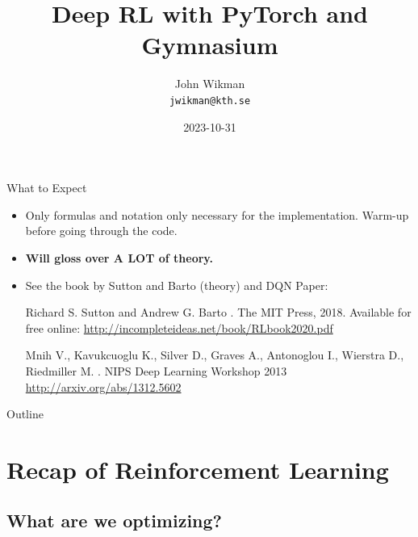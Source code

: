 \documentclass[aspectratio=1609,ADDITIONAL_DOCCLASS_ARGS]{beamer}
\title{Deep RL with PyTorch and Gymnasium}
\author{\parbox[t][5mm][c]{5cm}{\centering John Wikman\\\small{\texttt{jwikman@kth.se}}\vspace{5mm}}}
\institute{KTH Royal Institute of Technology}
\date{2023-10-31}
\begin{document}
\frame[plain, t]{\titlepage}


\begin{frame}{What to Expect}
  \begin{itemize}
  \setlength\itemsep{2mm}
  \item<1-> Only formulas and notation only necessary for the
        implementation. Warm-up before going through the code.
  \item<2-> \textbf{Will gloss over A LOT of theory.}
  \item<3-> See the book by Sutton and Barto (theory) and DQN Paper:
  {\small
        \begin{thebibliography}{10}

        \beamertemplatebookbibitems

          Richard S. Sutton and Andrew G. Barto
          .
          \newblock The MIT Press, 2018.
          \vspace{1mm}
          \newblock Available for free online:
          \newblock \url{http://incompleteideas.net/book/RLbook2020.pdf}

        \beamertemplatearticlebibitems

          Mnih V., Kavukcuoglu K., Silver D., Graves A., Antonoglou I., Wierstra D., Riedmiller M.
          .
          \newblock NIPS Deep Learning Workshop 2013
          \newblock \url{http://arxiv.org/abs/1312.5602}
        \end{thebibliography}
  }
  \end{itemize}
\end{frame}

\begin{frame}{Outline}
  \tableofcontents
\end{frame}

\section{Recap of Reinforcement Learning}
\subsection{What are we optimizing?}
\end{document}
